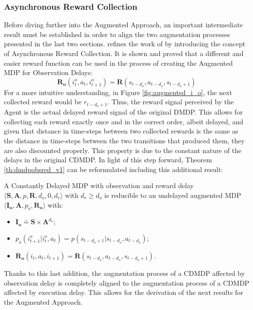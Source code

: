             \subsubsection{Asynchronous Reward Collection}
                Before diving further into the Augmented Approach, an important intermediate result must be established in order to align the two augmentation processes presented in the last two sections.  refines the work of  by introducing the concept of Asynchronous Reward Collection. It is shown and proved that a different and easier reward function can be used in the process of creating the Augmented MDP for Observation Delays:
                \[ \mathbf{R_{o}}\left( i^o_t, a_{t}, i^o_{t+1} \right) = \mathbf{R}\left(s_{t-d_{o}}, a_{t-d_{o}}, s_{t-d_{o}+1} \right)\]
                For a more intuitive understanding, in Figure \ref{fig:augmented_i_o}, the next collected reward would be $r_{t-d_{o}+1}$. Thus, the reward signal perceived by the Agent is the actual delayed reward signal of the original DMDP. This allows for collecting each reward exactly once and in the correct order, albeit delayed, and given that distance in time-steps between two collected rewards is the same as the distance in time-steps between the two transitions that produced them, they are also discounted properly. This property is due to the constant nature of the delays in the original CDMDP. In light of this step forward, Theorem \ref{th:dmdpobsred_v1} can be reformulated including this additional result:
                
                \begin{theorem}
                    \label{th:dmdpobsred_v2}
                    A Constantly Delayed MDP with observation and reward delay $\langle \mathbf{S}, \mathbf{A}, p, \mathbf{R}, d_o, 0, d_r \rangle$ with $d_r \geq d_o$ is reducible to an undelayed augmented MDP $\langle \mathbf{I_o}, \mathbf{A}, p_o, \mathbf{R_o} \rangle$ with: 
                    \begin{itemize}[topsep=0.5em, partopsep=0.5em]
                        \setlength\itemsep{0em}
                        \item $\mathbf{I_{o}} \doteq \mathbf{S} \times \mathbf{A}^{d_o}$;
                        \item $p_o \left( i_{t+1}^o | i_t^o , a_t  \right) = p ( s_{t-d_{o}+1} | s_{t-d_{o}}, a_{t-d_{o}})$;
                        \item $\mathbf{R_{o}}\left( i_t, a_{t}, i_{t+1} \right) = \mathbf{R}\left(s_{t-d_{o}}, a_{t-d_{o}}, s_{t-d_{o}+1} \right)$.
                    \end{itemize}
                \end{theorem}
                \noindent
                Thanks to this last addition, the augmentation process of a CDMDP affected by observation delay is completely aligned to the augmentation process of a CDMDP affected by execution delay. This allows for the derivation of the next results for the Augmented Approach.
            
